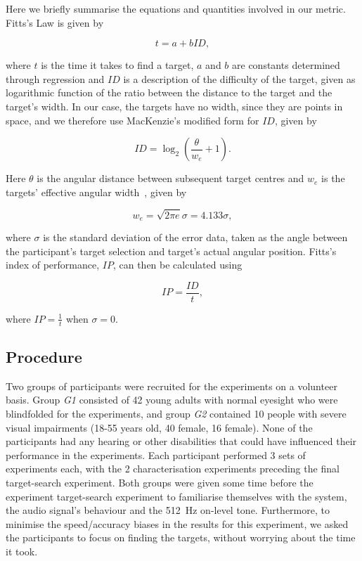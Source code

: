 \documentclass{article}
\begin{document}
Here we briefly summarise the equations and quantities involved in our metric.
Fitts's Law is given by  

\begin{equation}
  \label{eq:fitts-base}
  t = a + bID,
\end{equation}

\noindent
where $t$ is the time it takes to find a target, $a$ and $b$ are constants determined through regression and $ID$ is a description of the difficulty of the target, given as logarithmic function of the ratio between the distance to the target and the target's width.
In our case, the targets have no width, since they are points in space, and we therefore use MacKenzie's modified form for $ID$, given by

\begin{equation}
  \label{eq:fitts-id}
  ID = \log_2\left(\frac{\theta}{w_e} + 1\right).
\end{equation}

\noindent
Here $\theta$ is the angular distance between subsequent target centres and $w_e$ is the targets' effective angular width~\cite{welford1968fundamentals}, given by

\begin{equation}
  \label{eq:fitts-we}
  w_e = \sqrt{2\pi e}\sigma = 4.133\sigma,
\end{equation}

\noindent
where $\sigma$ is the standard deviation of the error data, taken as the angle between the participant's target selection and target's actual angular position.
Fitts's index of performance, $IP$, can then be calculated using 

\begin{equation}
  \label{eq:fitts-performance}
  IP = \frac{ID}{t},
\end{equation}

\noindent
where $IP = \frac{1}{t}$ when $\sigma=0$.

\subsection{Procedure}

Two groups of participants were recruited for the experiments on a volunteer basis. 
Group \textit{G1} consisted of 42 young adults with normal eyesight who were blindfolded for the experiments, and group \textit{G2} contained 10 people with severe visual impairments (18-55 years old, 40 female, 16 female). 
None of the participants had any hearing or other disabilities that could have influenced their performance in the experiments.
Each participant performed 3 sets of experiments each, with the 2 characterisation experiments preceding the final target-search experiment. 
Both groups were given some time before the experiment target-search experiment to familiarise themselves with the system, the audio signal's behaviour and the \SI{512}{\hertz} on-level tone. 
Furthermore, to minimise the speed/accuracy biases in the results for this experiment, we asked the participants to focus on finding the targets, without worrying about the time it took. 
\end{document}

